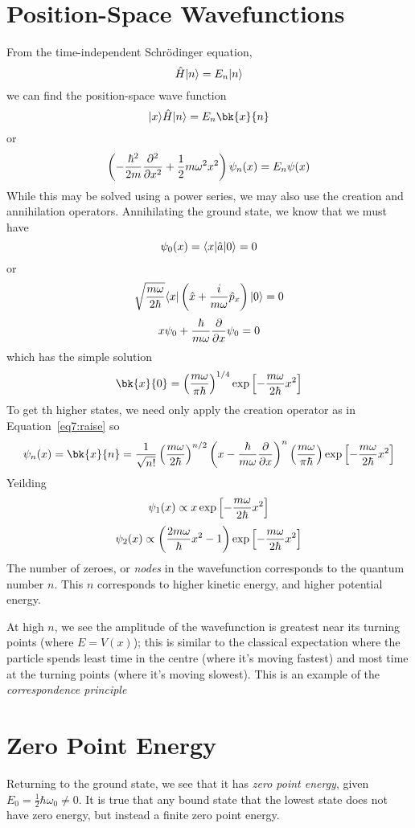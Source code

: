 \section{Position-Space Wavefunctions}
From the time-independent Schr\"odinger equation,
\[\hat H\lvert n\rangle=E_n\lvert n\rangle\]
we can find the position-space wave function
\[\k{x}\hat H\k{n}=E_n\bk{x}{n}\]
or
\begin{equation}
	\left(-\frac{\hbar^2}{2m}\frac{\partial ^2}{\partial x^2}+\frac{1}{2}m\omega^2 x^2\right)\psi_n(x)=E_n\psi(x)
\end{equation}
While this may be solved using a power series, we may also use the creation and annihilation operators. Annihilating the ground state, we know that we must have
\begin{equation}
	\psi_0(x)=\langle x\rvert\hat a \lvert0\rangle = 0
\end{equation}
or
\[\sqrt{\frac{m\omega}{2\hbar}}\langle x\rvert\left(\hat x + \frac{i}{m\omega}\hat p_x\right)\lvert0\rangle=0\]
\[x\psi_0+\frac{\hbar}{m\omega}\frac{\partial }{\partial x}\psi_0=0\]
which has the simple solution
\begin{equation}
	\bk{x}{0}=\left(\frac{m\omega}{\pi\hbar}\right)^{1/4}\exp\left[-\frac{m\omega}{2\hbar}x^2\right]
\end{equation}
To get th higher states, we need only apply the creation operator as in Equation~\ref{eq7:raise}
so
\begin{equation}
	\p_n(x)=\bk{x}{n}=\frac{1}{\sqrt{n!}}\left(\frac{m\omega}{2\hbar}\right)^{n/2}\left(x-\frac{\hbar}{m\omega}\pder{}{x}\right)^n\left(\frac{m\omega}{\pi\hbar}\right)\exp\left[-\frac{m\omega}{2\hbar}x^2\right]
\end{equation}
Yeilding
\[\psi_1(x)\propto x\exp\left[-\frac{m\omega}{2\hbar}x^2\right]\]
\[\psi_2(x)\propto \left(\frac{2m\omega}{\hbar}x^2-1\right)\exp\left[-\frac{m\omega}{2\hbar}x^2\right]\]
The number of zeroes, or \emph{nodes} in the wavefunction corresponds to the quantum number \(n\). This \(n\) corresponds to higher kinetic energy, and higher potential energy. 

At high \(n\), we see the amplitude of the wavefunction is greatest near its turning points (where \(E=V(x)\)); this is similar to the classical expectation where the particle spends least time in the centre (where it's moving fastest) and most time at the turning points (where it's moving slowest). This is an example of the \emph{correspondence principle}

\section{Zero Point Energy}
Returning to the ground state, we see that it has \emph{zero point energy}, given \(E_0=\frac{1}{2}\hbar\omega_0\neq0\). It is true that any bound state that the lowest state does not have zero energy, but instead a finite zero point energy.

